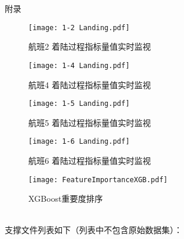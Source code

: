 \documentclass{MathorCupModeling}
\begin{document}

	\begin{center}
		\heiti{} 附\hspace{2pc}录
	\end{center}

	\begin{figure}[H]
		\centering
		\texttt{[image: 1-2 Landing.pdf]}
		\caption{航班2 着陆过程指标量值实时监视}
		\label{fig:1-2}
	\end{figure}
	\begin{figure}[H]
		\centering
		\texttt{[image: 1-4 Landing.pdf]}
		\caption{航班4 着陆过程指标量值实时监视}
		\label{fig:1-4}
	\end{figure}
	\begin{figure}[H]
		\centering
		\texttt{[image: 1-5 Landing.pdf]}
		\caption{航班5 着陆过程指标量值实时监视}
		\label{fig:1-5}
	\end{figure}
	\begin{figure}[H]
		\centering
		\texttt{[image: 1-6 Landing.pdf]}
		\caption{航班6 着陆过程指标量值实时监视}
		\label{fig:1-6}
	\end{figure}

	\begin{figure}[H]
		\centering
		\texttt{[image: FeatureImportanceXGB.pdf]}
		\caption{XGBoost重要度排序}
		\label{fig:XGBoost排序}
	\end{figure}
\newpage
	~\\

	支撑文件列表如下（列表中不包含原始数据集）：

\newpage

	~\\
\end{document}
